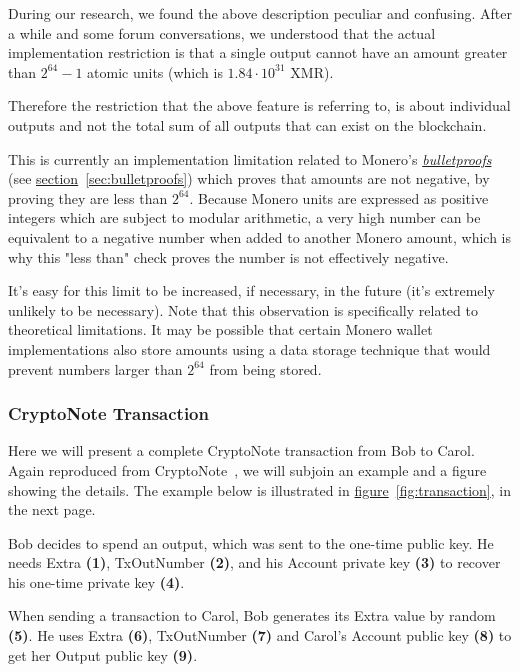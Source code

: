During our research, we found the above description peculiar and confusing. After a while and some forum conversations, we understood that the actual implementation restriction is that a single output cannot have an amount greater than $2^{64} − 1$ atomic units (which is $1.84 \cdot 10^{31}$ XMR).

Therefore the restriction that the above feature is referring to, is about individual outputs and not the total sum of all outputs that can exist on the blockchain.
\vspace{0.2cm}

This is currently an implementation limitation related to Monero's \hyperref[sec:bulletproofs]{\emph{bulletproofs}}~\cite{getmonero} (see \hyperref[sec:bulletproofs]{section}~\ref{sec:bulletproofs}) which proves that amounts are not negative, by proving they are less than $2^{64}$. Because Monero units are expressed as positive integers which are subject to modular arithmetic, a very high number can be equivalent to a negative number when added to another Monero amount, which is why this "less than" check proves the number is not effectively negative.

It's easy for this limit to be increased, if necessary, in the future (it's extremely unlikely to be necessary). Note that this observation is specifically related to theoretical limitations. It may be possible that certain Monero wallet implementations also store amounts using a data storage technique that would prevent numbers larger than $2^{64}$ from being stored.
\clearpage
\pagebreak

\subsubsection{CryptoNote Transaction} \label{sec:cryptonote_transaction}
%
Here we will present a complete CryptoNote transaction from Bob to Carol. Again reproduced from CryptoNote~\cite{cryptonote}, we will subjoin an example and a figure showing the details. The example below is illustrated in \hyperref[fig:transaction]{figure}~\ref{fig:transaction}, in the next page.

Bob decides to spend an output, which was sent to the one-time public key. He needs Extra \textbf{(1)}, TxOutNumber \textbf{(2)}, and his Account private key \textbf{(3)} to recover his one-time private key \textbf{(4)}.

When sending a transaction to Carol, Bob generates its Extra value by random \textbf{(5)}. He uses Extra \textbf{(6)}, TxOutNumber \textbf{(7)} and Carol's Account public key \textbf{(8)} to get her Output public key \textbf{(9)}.

